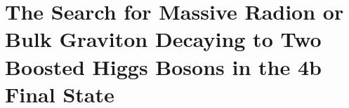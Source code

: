\chapter{The Search for Massive Radion or Bulk Graviton Decaying to Two Boosted Higgs Bosons in the 4b Final State}
\label{chap:five}
